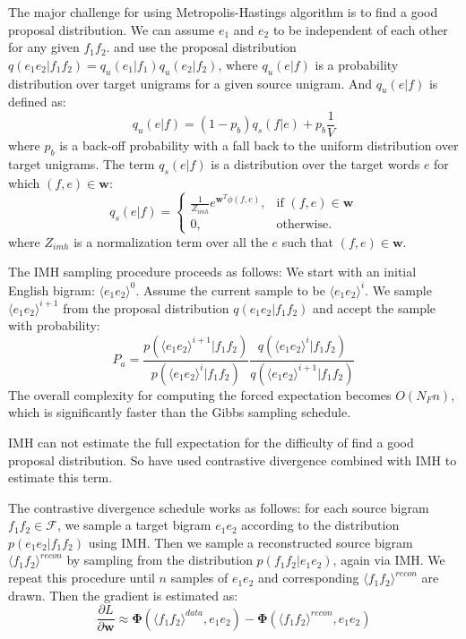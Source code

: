 The major challenge for using Metropolis-Hastings algorithm is to find a good proposal distribution.
We can assume $e_1$ and $e_2$ to be independent of each other for any given $f_1 f_2$.
and use the proposal distribution $q(e_1 e_2 | f_1 f_2) = q_u(e_1|f_1) q_u(e_2|f_2)$, where $q_u(e|f)$ is a probability distribution over target unigrams for a given source unigram.
And $q_u(e|f)$ is defined as:
\begin{equation}
q_u( e | f) = (1-p_b) q_s(f | e) + p_b \frac{1}{V}
\end{equation}
where $p_b$ is a back-off probability with a fall back to the uniform distribution over target unigrams. The term $q_s(e|f)$ is a distribution over the target words $e$ for which $(f,e) \in \mathbf{w}$:
\[
    q_s(e|f)= 
\begin{cases}
     \frac{1}{Z_{imh}} e^{\mathbf{w}^T \phi(f, e)} ,& \text{if } (f,e) \in \mathbf{w}\\
    0,              & \text{otherwise}.
\end{cases}
\]
where $Z_{imh}$ is a normalization term over all the $e$ such that $(f,e) \in \mathbf{w}$.


The IMH sampling procedure proceeds as follows: We start with an initial English bigram: $\langle e_1 e_2\rangle^{0}$. Assume the current sample to be $\langle e_1 e_2 \rangle^{i}$. We sample ${\langle e_1 e_2 \rangle}^{i+1}$ from the proposal distribution $q(e_1 e_2|f_1 f_2)$ and accept the sample with probability:
\begin{equation}
P_a = \frac{p( \langle e_1 e_2 \rangle^{i+1}|f_1f_2)} {p(\langle e_1 e_2 \rangle^{i}|f_1f_2) } \frac{q(\langle e_1e_2 \rangle^{i}|f_1f_2)}{q(\langle e_1e_2 \rangle^{i+1}|f_1f_2)}
\end{equation}
The overall complexity for computing the forced expectation becomes $O(N_F n)$, which is significantly faster than the Gibbs sampling schedule.


IMH can not estimate the full expectation for the difficulty of find a good proposal distribution. So  have used contrastive divergence combined with IMH to estimate this term.


The contrastive divergence schedule works as follows: for each source bigram $f_1 f_2 \in \mathcal{F}$, we sample a target bigram $e_1 e_2$ according to the distribution $p(e_1 e_2| f_1 f_2)$ using IMH. Then we sample a reconstructed source bigram $ \langle f_1 f_2 \rangle^{recon}$ by sampling from the distribution $p(f_1 f_2 | e_1 e_2)$, again via IMH. 
We repeat this procedure until $n$ samples of $e_1 e_2$ and corresponding $ \langle f_1 f_2  \rangle^{recon}$ are drawn. 
Then the gradient is estimated as:
\begin{equation}
\frac{\partial L} { \partial \mathbf{w}} \approx  \mathbf{\Phi}(\langle f_1 f_2\rangle^{data}, e_1 e_2) -   \mathbf{\Phi}(\langle f_1 f_2\rangle ^{recon}, e_1 e_2)
\end{equation}


